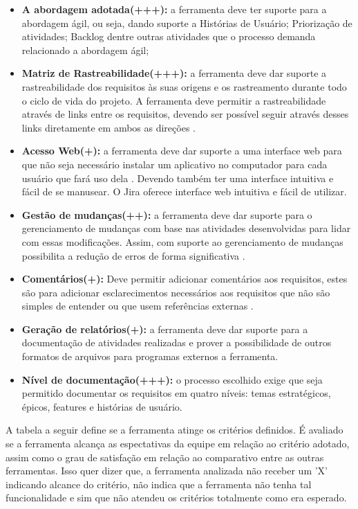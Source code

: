 \begin{itemize}
    \item \textbf{A abordagem adotada(+++):} a ferramenta deve ter suporte para a abordagem ágil, ou seja, dando suporte a Histórias de Usuário; Priorização de atividades; Backlog dentre outras atividades que o processo demanda relacionado a abordagem ágil;     
    \item \textbf{Matriz de Rastreabilidade(+++):} a ferramenta deve dar suporte a rastreabilidade dos requisitos às suas origens e os rastreamento durante todo o ciclo de vida do projeto. A ferramenta deve permitir a rastreabilidade através de links entre os requisitos, devendo ser possível seguir através desses links diretamente em ambos as direções \cite{hoffmann2004}.     
    \item \textbf{Acesso Web(+):} a ferramenta deve dar suporte a uma interface web para que não seja necessário instalar um aplicativo no computador para cada usuário que fará uso dela \cite{hoffmann2004}. Devendo também ter uma interface intuitiva e fácil de se manusear. O Jira oferece interface web intuitiva e fácil de utilizar.
    \item \textbf{Gestão de mudanças(++):} a ferramenta deve dar suporte para o gerenciamento de mudanças com base nas atividades desenvolvidas para lidar com essas modificações. Assim, com suporte ao gerenciamento de mudanças possibilita a redução de erros de forma significativa \cite{hoffmann2004}.
    \item \textbf{Comentários(+):} Deve permitir adicionar comentários aos requisitos, estes são para adicionar esclarecimentos necessários aos requisitos que não são simples de entender ou que usem referências externas \cite{hoffmann2004}.
    \item \textbf{Geração de relatórios(+):} a ferramenta deve dar suporte para a documentação de atividades realizadas e  prover a possibilidade de outros formatos de arquivos para programas externos a ferramenta.
    \item \textbf{Nível de documentação(+++):} o processo escolhido exige que seja permitido documentar os requisitos em quatro níveis: temas estratégicos, épicos, features e histórias de usuário.
\end{itemize}

A tabela a seguir define se a ferramenta atinge os critérios definidos. É avaliado se a ferramenta alcança as espectativas da equipe em relação ao critério adotado, assim como o grau de satisfação em relação ao comparativo entre as outras ferramentas. Isso quer dizer que, a ferramenta analizada não receber um 'X' indicando alcance do critério, não indica que a ferramenta não tenha tal funcionalidade e sim que não atendeu os critérios totalmente como era esperado.

